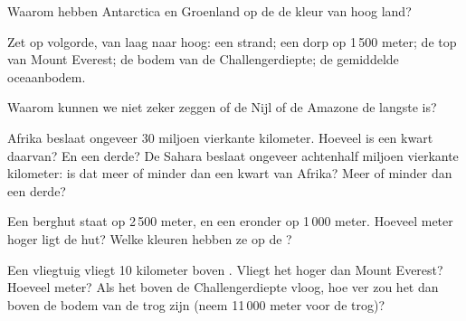 \begin{exercise}[$\star$]\label{exo:g4:world-physical-map:6}
Waarom hebben Antarctica en Groenland op de  de kleur
van hoog land?
\end{exercise}

\begin{exercise}[$\star\star$]\label{exo:g4:world-physical-map:7}
Zet op volgorde, van laag naar hoog: een strand; een dorp op
1\,500 meter; de top van Mount Everest; de bodem van de Challengerdiepte;
de gemiddelde oceaanbodem.
\end{exercise}

\begin{exercise}[$\star\star$]\label{exo:g4:world-physical-map:8}
Waarom kunnen we niet zeker zeggen of de Nijl of de Amazone de langste
 is?
\end{exercise}

\begin{exercise}[$\star\star$]\label{exo:g4:world-physical-map:9}
Afrika beslaat ongeveer 30 miljoen vierkante kilometer. Hoeveel is een
kwart daarvan? En een derde? De Sahara beslaat ongeveer achtenhalf miljoen
vierkante kilometer: is dat meer of minder dan een kwart van Afrika? Meer
of minder dan een derde?
\end{exercise}

\begin{exercise}[$\star\star$]\label{exo:g4:world-physical-map:10}
Een berghut staat op 2\,500 meter, en een  eronder op 1\,000 meter.
Hoeveel meter hoger ligt de hut? Welke kleuren hebben ze op de
?
\end{exercise}

\begin{exercise}[$\star\star\star$]\label{exo:g4:world-physical-map:11}
Een vliegtuig vliegt 10 kilometer boven . Vliegt het hoger dan
Mount Everest? Hoeveel meter? Als het boven de Challengerdiepte vloog, hoe
ver zou het dan boven de bodem van de trog zijn (neem 11\,000 meter voor de
trog)?
\end{exercise}

